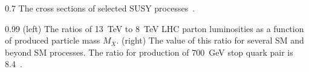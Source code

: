                  {0.7}       %
                 { The cross sections of selected SUSY processes~\cite{website:LHCxsec}. }

                 {0.99}       %
                 {(left) The ratios of 13~TeV to 8~TeV LHC parton luminosities as a function of produced particle mass $M_{X}$. (right) The value of this ratio for several SM and beyond SM processes.  The ratio for production of 700~GeV stop quark pair is 8.4~\cite{Hoecker:2236645}.}
\newpage
